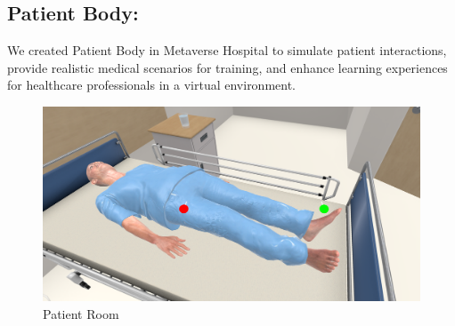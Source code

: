 \subsection{Patient Body:}	
We created Patient Body in Metaverse Hospital to simulate patient interactions, provide realistic medical scenarios for training, and enhance learning experiences for healthcare professionals in a virtual environment.
\begin{figure}[h]
	\centering
	\includegraphics[width=0.7\linewidth]{Images/Patient body.png}
	\caption{Patient Room}
	\label{fig:system-diagram}
\end{figure}	

	
